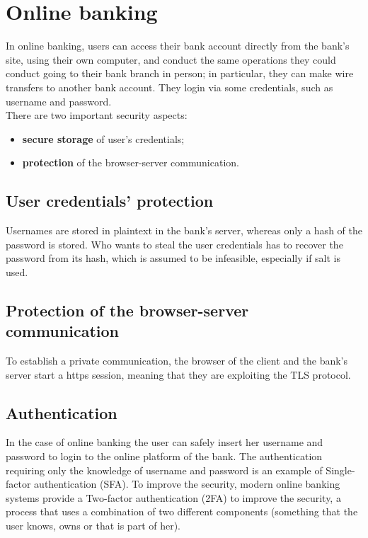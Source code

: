 \documentclass[a4paper, 10pt, titlepage]{article}
\begin{document}

\section{Online banking}
In online banking, users can access their bank account directly from the bank's site, using their own computer, and conduct the same operations they could conduct going to their bank branch in person; in particular, they can make wire transfers to another bank account. They login via some credentials, such as username and password. \\
There are two important security aspects:
\begin{itemize}
\item \textbf{secure storage} of user's credentials;
\item \textbf{protection} of the browser-server communication.
\end{itemize}

\subsection*{User credentials' protection}
Usernames are stored in plaintext in the bank's server, whereas only a hash of the password is stored. Who wants to steal the user credentials has to recover the password from its hash, which is assumed to be infeasible, especially if salt is used.

\subsection*{Protection of the browser-server communication}
To establish a private communication, the browser of the client and the bank's server start a https session, meaning that they are exploiting the TLS protocol. 

\subsection{Authentication}
In the case of online banking the user can safely insert her username and password to login to the online platform of the bank. 
The authentication requiring only the knowledge of username and password is an example of Single-factor authentication (SFA). To improve the security, modern online banking systems provide a Two-factor authentication (2FA) to improve the security, a process that uses a combination of two different components (something that the user knows, owns or that is part of her). 
\end{document}
